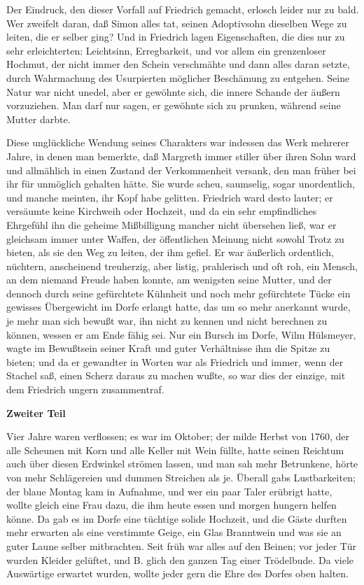Der Eindruck, den dieser Vorfall auf Friedrich gemacht, erlosch leider nur zu bald. Wer zweifelt daran, daß Simon alles tat, seinen Adoptivsohn dieselben Wege zu leiten, die er selber ging? Und in Friedrich lagen Eigenschaften, die dies nur zu sehr erleichterten: Leichtsinn, Erregbarkeit, und vor allem ein grenzenloser Hochmut, der nicht immer den Schein verschmähte und dann alles daran setzte, durch Wahrmachung des Usurpierten möglicher Beschämung zu entgehen. Seine Natur war nicht unedel, aber er gewöhnte sich, die innere Schande der äußern vorzuziehen. Man darf nur sagen, er gewöhnte sich zu prunken, während seine Mutter darbte.

Diese unglückliche Wendung seines Charakters war indessen das Werk mehrerer Jahre, in denen man bemerkte, daß Margreth immer stiller über ihren Sohn ward und allmählich in einen Zustand der Verkommenheit versank, den man früher bei ihr für unmöglich gehalten hätte. Sie wurde scheu, saumselig, sogar unordentlich, und manche meinten, ihr Kopf habe gelitten. Friedrich ward desto lauter; er versäumte keine Kirchweih oder Hochzeit, und da ein sehr empfindliches Ehrgefühl ihn die geheime Mißbilligung mancher nicht übersehen ließ, war er gleichsam immer unter Waffen, der öffentlichen Meinung nicht sowohl Trotz zu bieten, als sie den Weg zu leiten, der ihm gefiel. Er war äußerlich ordentlich, nüchtern, anscheinend treuherzig, aber listig, prahlerisch und oft roh, ein Mensch, an dem niemand Freude haben konnte, am wenigsten seine Mutter, und der dennoch durch seine gefürchtete Kühnheit und noch mehr gefürchtete Tücke ein gewisses Übergewicht im Dorfe erlangt hatte, das um so mehr anerkannt wurde, je mehr man sich bewußt war, ihn nicht zu kennen und nicht berechnen zu können, wessen er am Ende fähig sei. Nur ein Bursch im Dorfe, Wilm Hülsmeyer, wagte im Bewußtsein seiner Kraft und guter Verhältnisse ihm die Spitze zu bieten; und da er gewandter in Worten war als Friedrich und immer, wenn der Stachel saß, einen Scherz daraus zu machen wußte, so war dies der einzige, mit dem Friedrich ungern zusammentraf.

\textbf{Zweiter Teil}\bigskip

Vier Jahre waren verflossen; es war im Oktober; der milde Herbst von 1760, der alle Scheunen mit Korn und alle Keller mit Wein füllte, hatte seinen Reichtum auch über diesen Erdwinkel strömen lassen, und man sah mehr Betrunkene, hörte von mehr Schlägereien und dummen Streichen als je. Überall gabs Lustbarkeiten; der blaue Montag kam in Aufnahme, und wer ein paar Taler erübrigt hatte, wollte gleich eine Frau dazu, die ihm heute essen und morgen hungern helfen könne. Da gab es im Dorfe eine tüchtige solide Hochzeit, und die Gäste durften mehr erwarten als eine verstimmte Geige, ein Glas Branntwein und was sie an guter Laune selber mitbrachten. Seit früh war alles auf den Beinen; vor jeder Tür wurden Kleider gelüftet, und B. glich den ganzen Tag einer Trödelbude. Da viele Auswärtige erwartet wurden, wollte jeder gern die Ehre des Dorfes oben halten.

